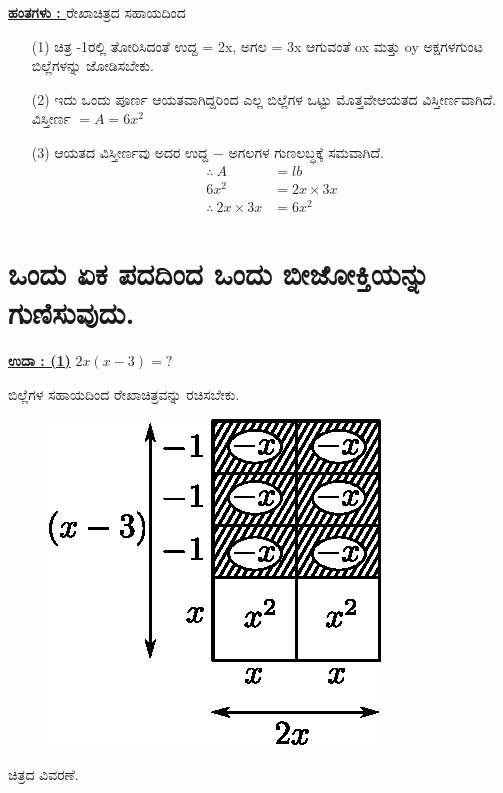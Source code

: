 \noindent
{\textbf{\underline{ಹಂತಗಳು : }}} ರೇಖಾಚಿತ್ರದ ಸಹಾಯದಿಂದ
\begin{itemize}
\item [(1)] ಚಿತ್ರ -1ರಲ್ಲಿ ತೋರಿಸಿದಂತೆ ಉದ್ದ = 2x, ಅಗಲ = 3x ಆಗುವಂತೆ ox ಮತ್ತು oy ಅಕ್ಷಗಳಗುಂಟ ಬಿಲ್ಲೆಗಳನ್ನು ಜೋಡಿಸಬೇಕು. 

\item [(2)] ಇದು ಒಂದು ಪೂರ್ಣ ಆಯತವಾಗಿದ್ದರಿಂದ ಎಲ್ಲ ಬಿಲ್ಲೆಗಳ ಒಟ್ಟು ಮೊತ್ತವೇ\break ಆಯತದ ವಿಸ್ತೀರ್ಣವಾಗಿದೆ. ವಿಸ್ತೀರ್ಣ $= A = 6x^2$

\item [(3)] ಆಯತದ ವಿಸ್ತೀರ್ಣವು ಅದರ ಉದ್ದ $-$ ಅಗಲಗಳ ಗುಣಲಬ್ಧಕ್ಕೆ ಸಮವಾಗಿದೆ.
\begin{align*}
\therefore~ A & = lb\\
6x^2 & = 2x \times 3x\\
\therefore~ 2x \times 3x & = 6x^2
\end{align*}

\end{itemize}

\section{ಒಂದು ಏಕ ಪದದಿಂದ ಒಂದು ಬೀಜೋಕ್ತಿಯನ್ನು ಗುಣಿಸುವುದು.}\label{sec3.5}%

\noindent
{\textbf{\underline{ಉದಾ : (1)}}} $2x (x-3) = ?$

ಬಿಲ್ಲೆಗಳ ಸಹಾಯದಿಂದ ರೇಖಾಚಿತ್ರವನ್ನು ರಚಿಸಬೇಕು.
\begin{figure}[H]
\centering
\includegraphics[scale=0.8]{src/figure/chap3/fig3-30a.eps}
\end{figure}
ಚಿತ್ರದ ವಿವರಣೆ.

